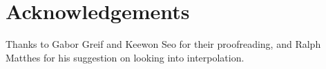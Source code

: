 \documentclass[a4paper,UKenglish]{lipics}
\begin{document}
\section*{Acknowledgements}
Thanks to Gabor Greif and Keewon Seo for their proofreading, and
Ralph Matthes for his suggestion on looking into interpolation.






\end{document}
